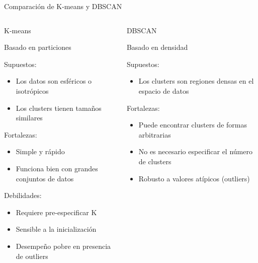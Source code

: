 \documentclass[aspectratio=169,12pt]{beamer}
\begin{document}
\begin{frame}{Comparación de K-means y DBSCAN}
    \begin{columns}[t]
        \begin{block}{K-means}
{\footnotesize
                Basado en particiones

                Supuestos:
                    \begin{itemize}[noitemsep,nolistsep]
                        \item Los datos son esféricos o isotrópicos
                        \item Los clusters tienen tamaños similares
                    \end{itemize}

                Fortalezas:
                    \begin{itemize}[noitemsep,nolistsep]
                        \item Simple y rápido
                        \item Funciona bien con grandes conjuntos de datos
                    \end{itemize}

                Debilidades:
                    \begin{itemize}[noitemsep,nolistsep]
                        \item Requiere pre-especificar K
                        \item Sensible a la inicialización
                        \item Desempeño pobre en presencia de outliers
                    \end{itemize}
}
        \end{block}

        \begin{block}{DBSCAN}
        {\footnotesize
                Basado en densidad

                Supuestos:
                    \begin{itemize}[noitemsep,nolistsep]
                        \item Los clusters son regiones densas en el espacio de datos
                    \end{itemize}

                Fortalezas:
                    \begin{itemize}[noitemsep,nolistsep]
                        \item Puede encontrar clusters de formas arbitrarias
                        \item No es necesario especificar el número de clusters
                        \item Robusto a valores atípicos (outliers)
                    \end{itemize}

}
\end{block}
\end{columns}
\end{frame}
\end{document}
